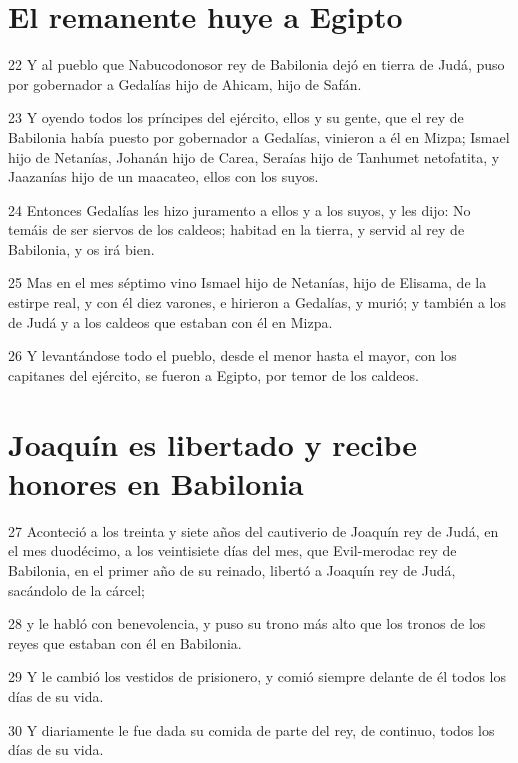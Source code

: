 \section*{El remanente huye a Egipto}

\par 22 Y al pueblo que Nabucodonosor rey de Babilonia dejó en tierra de Judá, puso por gobernador a Gedalías hijo de Ahicam, hijo de Safán.
\par 23 Y oyendo todos los príncipes del ejército, ellos y su gente, que el rey de Babilonia había puesto por gobernador a Gedalías, vinieron a él en Mizpa; Ismael hijo de Netanías, Johanán hijo de Carea, Seraías hijo de Tanhumet netofatita, y Jaazanías hijo de un maacateo, ellos con los suyos.
\par 24 Entonces Gedalías les hizo juramento a ellos y a los suyos, y les dijo: No temáis de ser siervos de los caldeos; habitad en la tierra, y servid al rey de Babilonia, y os irá bien. 
\par 25 Mas en el mes séptimo vino Ismael hijo de Netanías, hijo de Elisama, de la estirpe real, y con él diez varones, e hirieron a Gedalías, y murió; y también a los de Judá y a los caldeos que estaban con él en Mizpa. 
\par 26 Y levantándose todo el pueblo, desde el menor hasta el mayor, con los capitanes del ejército, se fueron a Egipto, por temor de los caldeos. 

\section*{Joaquín es libertado y recibe honores en Babilonia}

\par 27 Aconteció a los treinta y siete años del cautiverio de Joaquín rey de Judá, en el mes duodécimo, a los veintisiete días del mes, que Evil-merodac rey de Babilonia, en el primer año de su reinado, libertó a Joaquín rey de Judá, sacándolo de la cárcel;
\par 28 y le habló con benevolencia, y puso su trono más alto que los tronos de los reyes que estaban con él en Babilonia.
\par 29 Y le cambió los vestidos de prisionero, y comió siempre delante de él todos los días de su vida.
\par 30 Y diariamente le fue dada su comida de parte del rey, de continuo, todos los días de su vida.

